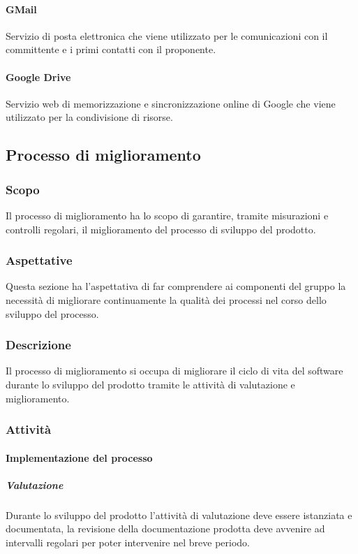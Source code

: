 \paragraph{GMail} 
Servizio di posta elettronica che viene utilizzato per le comunicazioni con il committente e i primi contatti con il proponente.
\paragraph{Google Drive} 
Servizio web di memorizzazione e sincronizzazione online di Google che viene utilizzato per la condivisione di risorse.


\newpage

\subsection{Processo di miglioramento}
\subsubsection{Scopo}
Il processo di miglioramento ha lo scopo di garantire, tramite misurazioni e controlli regolari, il miglioramento del processo di sviluppo del prodotto.

\subsubsection{Aspettative}
Questa sezione ha l'aspettativa di far comprendere ai componenti del gruppo la necessità di migliorare continuamente la qualità dei processi nel corso dello sviluppo del processo.


\subsubsection{Descrizione}
Il processo di miglioramento si occupa di migliorare il ciclo di vita del software durante lo sviluppo del prodotto tramite le attività di valutazione e miglioramento.


\subsubsection{Attività}
\paragraph{Implementazione del processo}

\subparagraph*{Valutazione} 
Durante lo sviluppo del prodotto l'attività di valutazione deve essere istanziata e documentata, la revisione della documentazione prodotta deve avvenire ad intervalli regolari per poter intervenire nel breve periodo.

